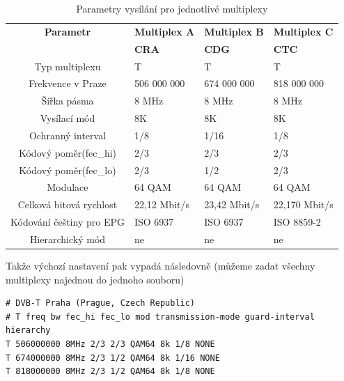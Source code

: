 \begin{table}
\begin{center}
\begin{tabular}{|c|l|l|l|}
\hline
\bf{Parametr} 		& \bf{Multiplex A} 	& \bf{Multiplex B} 	& \bf{Multiplex C} 	\\
			& 	\bf{CRA} 	& 	\bf{CDG} 	& 	\bf{CTC} 	\\
\hline
Typ multiplexu		&	T		&       T		&       T		\\
\hline
Frekvence v Praze	&	506 000 000	&       674 000 000	&       818 000 000	\\
\hline
Šířka pásma		&	8 MHz		&       8 MHz		&       8 MHz		\\
\hline
Vysílací mód		&	8K		&       8K		&       8K		\\
\hline
Ochranný interval 	&	1/8		&       1/16		&       1/8		\\
\hline
Kódový poměr(fec\_hi)	&	2/3		&       2/3		&       2/3		\\
\hline
Kódový poměr(fec\_lo)	&	2/3		&       1/2		&       2/3		\\
\hline
Modulace		&	64 QAM		&       64 QAM		&       64 QAM		\\
\hline
Celková bitová rychlost	&	22,12 Mbit/s	&	23,42 Mbit/s	&	22,170 Mbit/s	\\
\hline
Kódování češtiny pro EPG&	ISO 6937	&	ISO 6937	&	ISO 8859-2	\\
\hline
Hierarchický mód 	&	ne		&       ne		&       ne		\\
\hline
\end{tabular}
\end{center}
\caption{Parametry vysílání pro jednotlivé multiplexy}
\label{tab:mplexy}
\end{table}

\vspace{10pt}

Takže výchozí nastavení pak vypadá následovně (můžeme zadat všechny multiplexy najednou do jednoho souboru)

\vspace{10pt}

\begin{small}
\begin{verbatim}
# DVB-T Praha (Prague, Czech Republic)
# T freq bw fec_hi fec_lo mod transmission-mode guard-interval hierarchy
T 506000000 8MHz 2/3 2/3 QAM64 8k 1/8 NONE
T 674000000 8MHz 2/3 1/2 QAM64 8k 1/16 NONE
T 818000000 8MHz 2/3 1/2 QAM64 8k 1/8 NONE
\end{verbatim}
\end{small}

